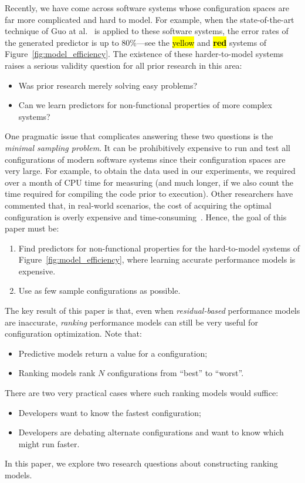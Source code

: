 \documentclass[sigconf]{acmart}
\DeclareRobustCommand{\hlyellow}[1]{{\sethlcolor{yellow}\hl{#1}}}
\DeclareRobustCommand{\hlred}[1]{{\sethlcolor{Myred}\textbf{\textcolor{white}{\hl{#1}}}}}
\begin{document}
Recently, we have come across software systems whose configuration spaces
are far more complicated and hard to model. For example, when the state-of-the-art technique of Guo at al.~\cite{guo2013variability} is applied to these software systems, the error
rates of the generated predictor is up to 80\%---see the 
\hlyellow{yellow} and
\hlred{red} systems of Figure~\ref{fig:model_efficiency}. The existence
of these harder-to-model systems raises a serious validity question 
for all prior research in this area:
\begin{itemize}
\item Was prior research merely solving easy problems?
\item Can we learn predictors for non-functional properties of more complex systems?
\end{itemize}
One pragmatic issue that complicates answering these two questions is the {\em minimal sampling problem}. It can be prohibitively expensive to run and test all configurations
of modern software systems since their configuration spaces are very large. For example, to obtain the data used in our experiments, we required over a month of  CPU time for measuring
(and much longer, if we also count the time required for compiling the code prior to
execution). Other researchers have commented that, in real-world scenarios, the cost
of acquiring the optimal configuration is overly expensive and time-consuming~\cite{weiss2008maximizing}. Hence, the goal of this paper must be:
\begin{enumerate}
\item Find  predictors for non-functional properties for the hard-to-model systems of Figure~\ref{fig:model_efficiency}, where learning accurate performance models is expensive.
\item Use as few sample configurations as possible.
\end{enumerate}

 
The key result of this paper is that, even when {\em residual-based} performance models are
inaccurate, {\em ranking} performance models can still be very useful for configuration optimization. Note that:
\begin{itemize}
\item Predictive models return a value for a configuration;
\item Ranking models rank $N$ configurations from ``best'' to ``worst''.
\end{itemize}
There are two very practical cases where such ranking models would suffice:
\begin{itemize}
\item Developers want to know the fastest configuration;
\item Developers are debating alternate configurations and want to know
which might run faster.
\end{itemize}
In this paper, we explore two research questions about  constructing ranking models.
\end{document}
